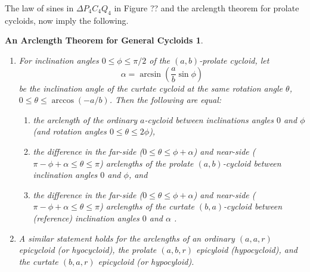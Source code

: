 \documentclass{ximera}
\newtheorem{theorem23}{An Arclength Theorem for General Cycloids}
\begin{document}


The law of sines in $\Delta P_4 C_4Q_4$ in Figure ?? and the arclength theorem for prolate cycloids, now imply the following.




\begin{theorem23}

\begin{enumerate}
\item For inclination angles $0\leq \phi \leq \pi/2$ of the $(a,b)$-prolate cycloid, let 
\[
    \alpha = \arcsin\left( \frac{a}{b}\sin\phi  \right) 
\]
be the inclination angle of the curtate cycloid at the same rotation angle $\theta$, $0\leq \theta\leq \arccos(-a/b)$. Then the following are equal:

\begin{enumerate}
\item the arclength of the ordinary $a$-cycloid between inclinations angles $0$ and $\phi$ (and rotation angles $0\leq \theta \leq 2\phi$), 

\item the difference in the far-side ($0\leq \theta \leq \phi + \alpha$) and near-side ($\pi- \phi + \alpha \leq \theta \leq \pi$) arclengths of the prolate $(a,b)$-cycloid between inclination angles $0$ and $\phi$, and

\item  the difference in the far-side ($0\leq \theta \leq \phi + \alpha$) and near-side ($\pi- \phi + \alpha \leq \theta \leq \pi$) arclengths of the curtate $(b,a)$-cycloid between (reference) inclination angles $0$ and $\alpha$ .

\end{enumerate}

\item A similar statement holds for the arclengths of an ordinary $(a,a,r)$ epicycloid (or hyocycloid), the prolate $(a,b,r)$ epicyloid (hypocycloid), and the curtate $(b,a,r)$ epicycloid (or hypocyloid).

\end{enumerate}

\end{theorem23}
\end{document}
